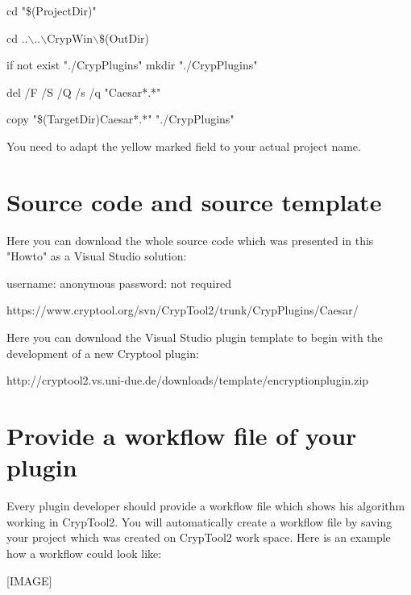 cd "\$(ProjectDir)"

cd ..$\backslash$..$\backslash$CrypWin$\backslash$\$(OutDir)

if not exist "./CrypPlugins" mkdir "./CrypPlugins"

del /F /S /Q /s /q "Caesar*.*"

copy "\$(TargetDir)Caesar*.*" "./CrypPlugins"

You need to adapt the yellow marked field to your actual project name.

\section{Source code and source template}\label{sec:SourceCodeAndSourceTemplate}
Here you can download the whole source code which was presented in this "Howto" as a Visual Studio solution:

username: anonymous\newline
password: not required

https://www.cryptool.org/svn/CrypTool2/trunk/CrypPlugins/Caesar/


Here you can download the Visual Studio plugin template to begin with the development of a new Cryptool plugin:

http://cryptool2.vs.uni-due.de/downloads/template/encryptionplugin.zip

\section{Provide a workflow file of your plugin}\label{ProvideAWorkflowFileOfYourPlugin}
Every plugin developer should provide a workflow file which shows his algorithm working in CrypTool2. You will automatically create a workflow file by saving your project which was created on CrypTool2 work space. Here is an example how a workflow could look like:

[IMAGE]
